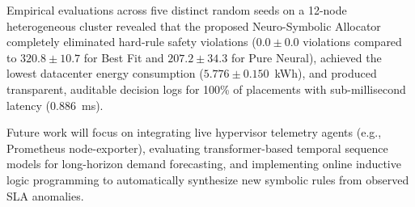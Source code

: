 \documentclass[conference]{IEEEtran}
\begin{document}
Empirical evaluations across five distinct random seeds on a 12-node heterogeneous cluster revealed that the proposed Neuro-Symbolic Allocator completely eliminated hard-rule safety violations ($0.0 \pm 0.0$ violations compared to $320.8 \pm 10.7$ for Best Fit and $207.2 \pm 34.3$ for Pure Neural), achieved the lowest datacenter energy consumption ($5.776 \pm 0.150$~kWh), and produced transparent, auditable decision logs for 100\% of placements with sub-millisecond latency ($0.886$~ms).

Future work will focus on integrating live hypervisor telemetry agents (e.g., Prometheus node-exporter), evaluating transformer-based temporal sequence models for long-horizon demand forecasting, and implementing online inductive logic programming to automatically synthesize new symbolic rules from observed SLA anomalies.
\end{document}
